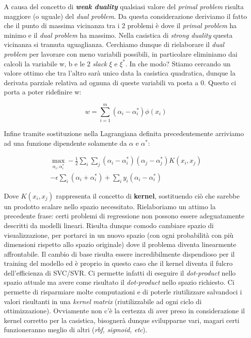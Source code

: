 \documentclass[12pt]{article}
\begin{document}
	A causa del concetto di \textbf{\textit{weak duality}} qualsiasi valore del \textit{primal problem} risulta maggiore (o uguale) del \textit{dual problem}. Da questa considerazione deriviamo il fatto che il punto di massima vicinanza tra i 2 problemi è dove il \textit{primal problem} ha minimo e il \textit{dual problem} ha massimo. Nella casistica di \textit{strong duality} questa vicinanza si tramuta uguaglianza.
Cerchiamo dunque di rielaborare il \textit{dual problem} per lavorare con meno variabili possibili, in particolare eliminiamo dai calcoli la variabile w, b e le 2 \textit{slack} $\xi$ e $\xi^*$. In che modo? Stiamo cercando un valore ottimo che tra l’altro sarà unico data la casistica quadratica, dunque la derivata parziale relativa ad ognuna di queste variabili va posta a 0. Questo ci porta a poter ridefinire w:

	\begin{equation}\label{eq:4}
		w = \sum_{i=1}^{m}(\alpha_i - \alpha_i^*)\phi(x_i)
	\end{equation}

	Infine tramite sostituzione nella Lagrangiana definita precedentemente arriviamo ad una funzione dipendente solamente da $\alpha$ e $\alpha^*$:

	\begin{equation}\label{eq:5}
	\begin{gathered}
		\max_{\alpha_i,\alpha_i^*} - \frac{1}{2}\sum_i\sum_j(\alpha_i - \alpha_i^*)(\alpha_j - \alpha_j^*)K(x_i,x_j) \\
		- \epsilon\sum_i(\alpha_i + \alpha_i^*) + \sum_i y_i(\alpha_i - \alpha_i^*)
	\end{gathered}
	\end{equation}

	Dove $K(x_i,x_j)$ rappresenta il concetto di \textbf{kernel}, sostituendo ciò che sarebbe un prodotto scalare nello spazio necessitato. Rielaboriamo un attimo la precedente frase: certi problemi di regressione non possono essere adeguatamente descritti da modelli lineari. Risulta dunque comodo cambiare spazio di visualizzazione, per portarci in un nuovo spazio (con ogni probabilità con più dimensioni rispetto allo spazio originale) dove il problema diventa linearmente affrontabile. Il cambio di base risulta essere incredibilmente dispendioso per il training del modello ed è proprio in questo caso che il kernel diventa il fulcro dell’efficienza di SVC/SVR. Ci permette infatti di eseguire il \textit{dot-product} nello spazio attuale ma avere come risultato il \textit{dot-product} nello spazio richiesto. Ci permette di risparmiare molte computazioni e di poterle riutilizzare salvandoci i valori risultanti in una \textit{kernel matrix} (riutilizzabile ad ogni ciclo di ottimizzazione). Ovviamente non c’è la certezza di aver preso in considerazione il kernel corretto per la casistica, bisognerà dunque svilupparne vari, magari certi funzioneranno meglio di altri (\textit{rbf, sigmoid, etc}). 
\end{document}
